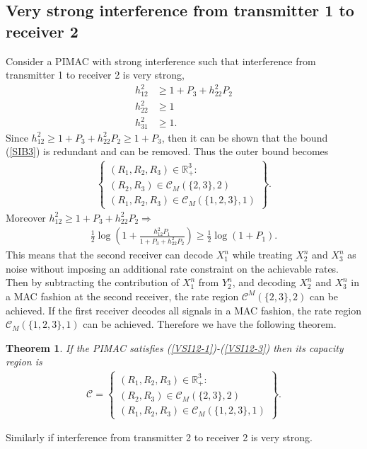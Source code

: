 \documentclass[10pt,conference]{IEEEtran}
\newtheorem{theorem}{Theorem}
\begin{document}
\subsection{Very strong interference from transmitter 1 to receiver 2}
Consider a PIMAC with strong interference such that interference from transmitter 1 to receiver 2 is very strong, 
\begin{align}
\label{VSI12-1}
h_{12}^2&\geq1+P_3+h_{22}^2P_2\\
h_{22}^2&\geq1\\
\label{VSI12-3}
h_{31}^2&\geq1.
\end{align}
Since $h_{12}^2\geq1+P_3+h_{22}^2P_2\geq1+P_3$, then it can be shown that the bound (\ref{SIB3}) is redundant and can be removed. Thus the outer bound becomes
\begin{align}
\left\{
\begin{array}{l}
(R_1,R_2,R_3)\in\mathbb{R}_+^3:\\
(R_2,R_3)\in\mathcal{C}_M(\{2,3\},2)\\
(R_1,R_2,R_3)\in\mathcal{C}_M(\{1,2,3\},1)
\end{array}\right\}.
\end{align} 
Moreover $h_{12}^2\geq1+P_3+h_{22}^2P_2\Rightarrow$
\begin{align}
\frac{1}{2}\log\left(1+\frac{h_{12}^2P_1}{1+P_3+h_{22}^2P_2}\right)\geq\frac{1}{2}\log(1+P_1).
\end{align}
This means that the second receiver can decode $X_1^n$ while treating $X_2^n$ and $X_3^n$ as noise without imposing an additional rate constraint on the achievable rates. Then by subtracting the contribution of $X_1^n$ from $Y_2^n$, and decoding $X_2^n$ and $X_3^n$ in a MAC fashion at the second receiver, the rate region $\mathcal{C}^M(\{2,3\},2)$ can be achieved. If the first receiver decodes all signals in a MAC fashion, the rate region $\mathcal{C}_M(\{1,2,3\},1)$ can be achieved. Therefore we have the following theorem.
\begin{theorem}
If the PIMAC satisfies (\ref{VSI12-1})-(\ref{VSI12-3}) then its capacity region is
\begin{align}
\mathcal{C}=\left\{
\begin{array}{l}
(R_1,R_2,R_3)\in\mathbb{R}_+^3:\\
(R_2,R_3)\in\mathcal{C}_M(\{2,3\},2)\\
(R_1,R_2,R_3)\in\mathcal{C}_M(\{1,2,3\},1)
\end{array}\right\}.
\end{align} 
\end{theorem}
Similarly if interference from transmitter 2 to receiver 2 is very strong.
\end{document}
